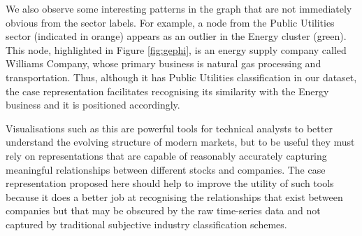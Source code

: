 \documentclass[runningheads]{llncs}
\begin{document}


We also observe some interesting patterns in the graph that are not immediately obvious from the sector labels. For example, a node from the Public Utilities sector (indicated in orange) appears as an outlier in the Energy cluster (green). This node, highlighted in Figure \ref{fig:gephi}, is an energy supply company called Williams Company, whose primary business is natural gas processing and transportation. Thus, although it has Public Utilities classification in our dataset, the case representation facilitates recognising its similarity with the Energy business and it is positioned accordingly. 

Visualisations such as this are powerful tools for technical analysts to better understand the evolving structure of modern markets, but to be useful they must rely on representations that are capable of reasonably accurately capturing meaningful relationships between different stocks and companies. The case representation proposed here should help to improve the utility of such tools because it does a better job at recognising the relationships that exist between companies but that may be obscured by the raw time-series data and not captured by traditional subjective industry classification schemes.


\end{document}
